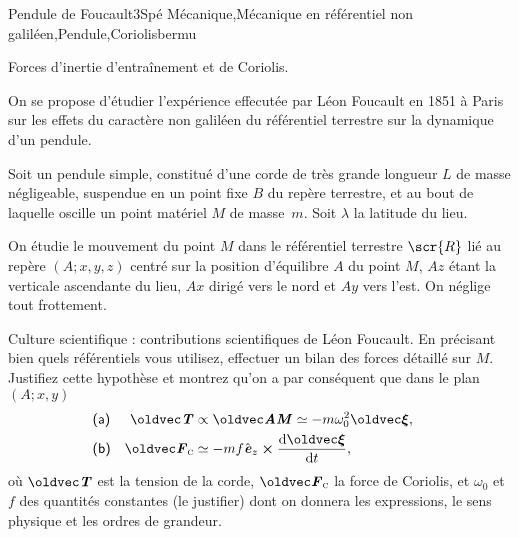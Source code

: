 
\begin{exercise}{Pendule de Foucault}{3}{Spé}
{Mécanique,Mécanique en référentiel non galiléen,Pendule,Coriolis}{bermu}

\begin{questions}
    \questioncours Forces d'inertie d'entraînement et de Coriolis.

\begin{EnvUplevel}
On se propose d'étudier l'expérience effecutée par Léon Foucault en 1851 à Paris sur les effets du caractère non galiléen du référentiel terrestre sur la dynamique d'un pendule.

Soit un pendule simple, constitué d’une corde de très grande longueur $L$ de masse négligeable, suspendue en un point fixe $B$ du repère terrestre, et au bout de laquelle oscille un point matériel $M$ de masse~$m$. Soit $\lambda$ la latitude du lieu.

On étudie le mouvement du point $M$ dans le référentiel terrestre $\scr{R}$ lié au repère $(A ; x, y,z)$ centré sur la position d’équilibre $A$ du point $M$, $Az$ étant la verticale ascendante du lieu, $Ax$ dirigé vers le nord et $Ay$ vers l'est. On néglige tout frottement.
\end{EnvUplevel}
    \questionbonus Culture scientifique : contributions scientifiques de Léon Foucault.
    \question En précisant bien quels référentiels vous utilisez, effectuer un bilan des forces détaillé sur $M$.
    \question Justifiez cette hypothèse et montrez qu'on a par conséquent que dans le plan $(A ; x, y)$
    \begin{align*}
        &\textsf{(a)}& \vec{T} & \propto \vec{AM} \simeq - m\omega_0^2 \vec{\xi}, &&\\
        &\textsf{(b)}& \vec{F}_\textsc{c} &\simeq -m f \ve_z \cross\dv{\vec{\xi}}{t},&&
    \end{align*}
    où $\vT$ est la tension de la corde, $\vec{F}_\textsc{c}$ la force de Coriolis, et $\omega_0$ et $f$ des quantités constantes (le justifier) dont on donnera les expressions, le sens physique et les ordres de grandeur.
    

\end{questions}
\end{exercise}
